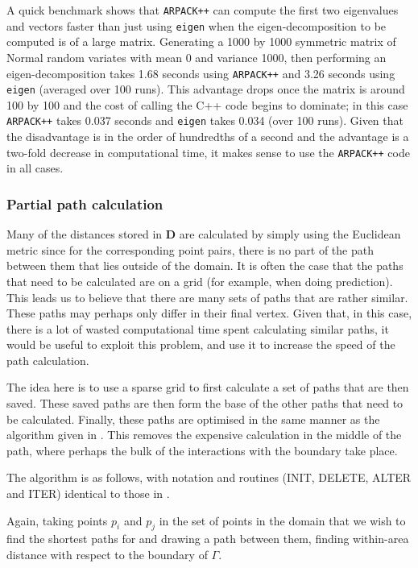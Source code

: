 A quick benchmark shows that \texttt{ARPACK++} can compute the first two eigenvalues and vectors faster than just using \texttt{eigen} when the eigen-decomposition to be computed is of a large matrix. Generating a 1000 by 1000 symmetric matrix of Normal random variates with mean 0 and variance 1000, then performing an eigen-decomposition takes 1.68 seconds using \texttt{ARPACK++} and 3.26 seconds using \texttt{eigen} (averaged over 100 runs). This advantage drops once the matrix is around 100 by 100 and the cost of calling the C++ code begins to dominate; in this case \texttt{ARPACK++} takes 0.037 seconds and \texttt{eigen} takes 0.034 (over 100 runs). Given that the disadvantage is in the order of hundredths of a second and the advantage is a two-fold decrease in computational time, it makes sense to use the \texttt{ARPACK++} code in all cases.


\subsubsection{Partial path calculation}

Many of the distances stored in $\mathbf{D}$ are calculated by simply using the Euclidean metric since for the corresponding point pairs, there is no part of the path between them that lies outside of the domain. It is often the case that the paths that need to be calculated are on a grid (for example, when doing prediction). This leads us to believe that there are many sets of paths that are rather similar. These paths may perhaps only differ in their final vertex. Given that, in this case, there is a lot of wasted computational time spent calculating similar paths, it would be useful to exploit this problem, and use it to increase the speed of the path calculation.

The idea here is to use a sparse grid to first calculate a set of paths that are then saved. These saved paths are then form the base of the other paths that need to be calculated. Finally, these paths are optimised in the same manner as the algorithm given in . This removes the expensive calculation in the middle of the path, where perhaps the bulk of the interactions with the boundary take place.

The algorithm is as follows, with notation and routines (INIT, DELETE, ALTER and ITER) identical to those in . 

Again, taking points $p_i$ and $p_j$ in the set of points in the domain that we wish to find the shortest paths for and drawing a path between them, finding within-area distance with respect to the boundary of $\Gamma$.

